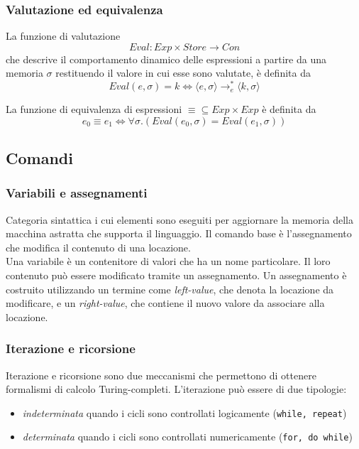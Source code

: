 \documentclass[a4paper, 10pt]{article}
\begin{document}
	\subsubsection{Valutazione ed equivalenza}
	La funzione di valutazione 
	\[
	Eval:Exp \times Store \to Con
	\]
	che descrive il comportamento dinamico delle espressioni a partire da una memoria $\sigma$ restituendo il valore in cui esse sono valutate, è definita da 
	\[
	Eval(e, \sigma)=k \iff \langle e, \sigma \rangle \to_e^* \langle k, \sigma \rangle
	\]
	
	La funzione di equivalenza di espressioni $\equiv \subseteq Exp \times Exp$ è definita da 
	\[
	e_0 \equiv e_1 \iff \forall \sigma.(Eval(e_0,\sigma)=Eval(e_1, \sigma))
	\]
	
	\subsection{Comandi}
	\subsubsection{Variabili e assegnamenti}
	Categoria sintattica i cui elementi sono eseguiti per aggiornare la memoria della macchina astratta che supporta il linguaggio. Il comando base è l'assegnamento che modifica il contenuto di una locazione. \\
	
	Una variabile è un contenitore di valori che ha un nome particolare. Il loro contenuto può essere modificato tramite un assegnamento. Un assegnamento è costruito utilizzando un termine come \textit{left-value}, che denota la locazione da modificare, e un \textit{right-value}, che contiene il nuovo valore da associare alla locazione.
	
	\subsubsection{Iterazione e ricorsione}
	Iterazione e ricorsione sono due meccanismi che permettono di ottenere formalismi di calcolo Turing-completi.
	L'iterazione può essere di due tipologie:
	\begin{itemize}
		\item \textit{indeterminata} quando i cicli sono controllati logicamente (\verb|while, repeat|)
		\item \textit{determinata} quando i cicli sono controllati numericamente (\verb|for, do while|)
	\end{itemize}
	
\end{document}
